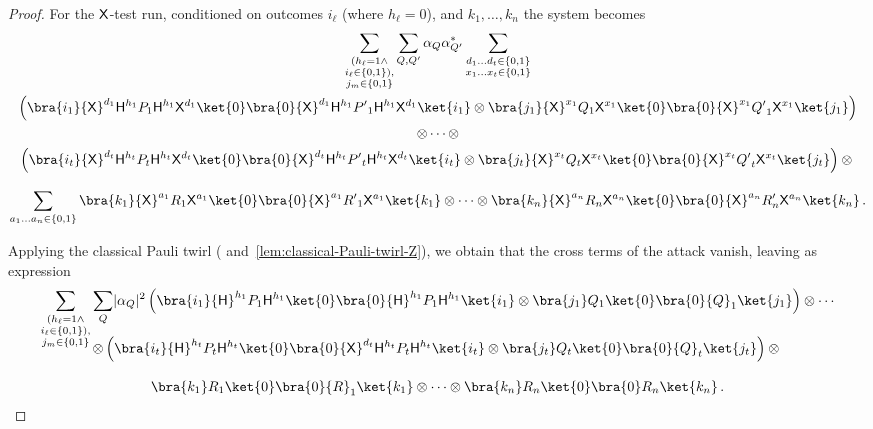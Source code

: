 \documentclass{toc}
\newcommand{\hgate}{{\sf H}}
\newcommand{\xgate}{{\sf X}}
\providecommand{\abs}[1]{\lvert#1\rvert}
\newcommand{\ketbra}[2]{\ket{#1}\bra{#2}}			%
\newcommand{\egoketbra}[1]{\ketbra{#1}{#1}}			%
\begin{document}
\begin{proof}
 For the $\xgate$-test run, conditioned on outcomes $i_\ell$ (where $h_\ell =0$), and
   $k_1, \ldots ,k_n$ the system becomes%
%
\begin{multline}
\sum_{\substack{ (h_\ell=1 \wedge \\  i_\ell \in \{0,1\}), \\
j_m \in \{0,1\}}}\sum_{Q, Q'} \alpha_Q \alpha^*_{Q'} \sum_{\substack{d_1 \ldots d_t \in \{0,1\} \\ x_1 \ldots x_t \in \{0,1\}}}\\
 \left( \bra{i_1} \xgate^{d_1} \hgate^{h_1} P_1 \hgate^{h_1} \xgate^{d_1} \egoketbra{0} \xgate^{d_1} {\hgate}^{h_1} {P'}_1 {\hgate}^{h_1} \xgate^{d_1} \ket{i_1} \otimes
\bra{j_1} \xgate^{x_1} Q_1 \xgate^{x_1} \egoketbra{0} \xgate^{x_1} {Q'}_1 \xgate^{x_1} \ket{j_1} \right)\\
 \otimes  \cdots
   \otimes
     \\\left(  \bra{i_t} \xgate^{d_t} \hgate^{h_t}  P_t \hgate^{h_t}   \xgate^{d_t}  \egoketbra{0} \xgate^{d_t} {\hgate}^{h_t}  {P'}_t {\hgate}^{h_t} \xgate^{d_t} \ket{i_t}  \otimes \bra{j_t} \xgate^{x_t}  Q_t \xgate^{x_t}  \egoketbra{0} \xgate^{x_t} {Q'}_t \xgate^{x_t} \ket{j_t} \right)
\otimes  {}\\[2ex]\sum_{a_1 \ldots a_n \in \{0,1\}}\bra{k_1} \xgate^{a_1}R_1 \xgate^{a_1} \egoketbra{0} \xgate^{a_1}{R'}_1 \xgate^{a_1} \ket{k_1} \otimes \cdots \otimes \bra{k_n} \xgate^{a_n}  R_n \xgate^{a_n} \egoketbra{0} \xgate^{a_n} R'_n \xgate^{a_n} \ket{k_n}\,.
\end{multline}

Applying the classical Pauli twirl ( and~\ref{lem:classical-Pauli-twirl-Z}), we obtain that the cross terms of the attack vanish, leaving as expression%
%
\begin{multline}
\sum_{\substack{(h_\ell=1 \wedge \\  i_\ell \in \{0,1\}), \\
j_m \in \{0,1\}}} \sum_{Q} \abs{\alpha_Q}^2
 \left( \bra{i_1} \hgate^{h_1} P_1 \hgate^{h_1}  \egoketbra{0}  {\hgate}^{h_1} {P}_1 {\hgate}^{h_1}  \ket{i_1} \otimes
\bra{j_1}  Q_1  \egoketbra{0}  {Q}_1  \ket{j_1} \right) \otimes  \cdots  \\[-3ex]
   \otimes  \left(  \bra{i_t}  \hgate^{h_t}  P_t \hgate^{h_t}     \egoketbra{0} \xgate^{d_t} {\hgate}^{h_t}  {P}_t {\hgate}^{h_t}  \ket{i_t}  \otimes \bra{j_t}   Q_t   \egoketbra{0}  {Q}_t  \ket{j_t} \right)
\otimes  {}\\[2ex]\bra{k_1} R_1  \egoketbra{0} {R}_1  \ket{k_1} \otimes \cdots \otimes \bra{k_n}   R_n \egoketbra{0}  R_n  \ket{k_n}\,.
\end{multline}



\end{proof}
\end{document}
